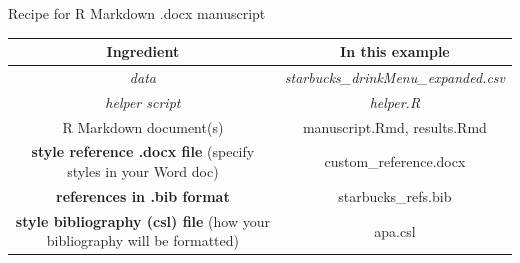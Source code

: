 \documentclass[
  ignorenonframetext,
]{beamer}
\begin{document}
\begin{frame}[fragile]

\begin{block}{Recipe for R Markdown .docx manuscript}

\begin{longtable}[]{@{}cc@{}}
\toprule
\begin{minipage}[b]{0.42\columnwidth}\centering
Ingredient\strut
\end{minipage} & \begin{minipage}[b]{0.52\columnwidth}\centering
In this example\strut
\end{minipage}\tabularnewline
\midrule
\endhead
\begin{minipage}[t]{0.42\columnwidth}\centering
\emph{data}\strut
\end{minipage} & \begin{minipage}[t]{0.52\columnwidth}\centering
\emph{starbucks\_drinkMenu\_expanded.csv}\strut
\end{minipage}\tabularnewline
\begin{minipage}[t]{0.42\columnwidth}\centering
\emph{helper script}\strut
\end{minipage} & \begin{minipage}[t]{0.52\columnwidth}\centering
\emph{helper.R}\strut
\end{minipage}\tabularnewline
\begin{minipage}[t]{0.42\columnwidth}\centering
R Markdown document(s)\strut
\end{minipage} & \begin{minipage}[t]{0.52\columnwidth}\centering
manuscript.Rmd, results.Rmd\strut
\end{minipage}\tabularnewline
\begin{minipage}[t]{0.42\columnwidth}\centering
\textbf{style reference .docx file} (specify styles in your Word
doc)\strut
\end{minipage} & \begin{minipage}[t]{0.52\columnwidth}\centering
custom\_reference.docx\strut
\end{minipage}\tabularnewline
\begin{minipage}[t]{0.42\columnwidth}\centering
\textbf{references in .bib format}\strut
\end{minipage} & \begin{minipage}[t]{0.52\columnwidth}\centering
starbucks\_refs.bib\strut
\end{minipage}\tabularnewline
\begin{minipage}[t]{0.42\columnwidth}\centering
\textbf{style bibliography (csl) file} (how your bibliography will be
formatted)\strut
\end{minipage} & \begin{minipage}[t]{0.52\columnwidth}\centering
apa.csl\strut
\end{minipage}\tabularnewline
\bottomrule
\end{longtable}


\end{block}
\end{frame}
\end{document}
